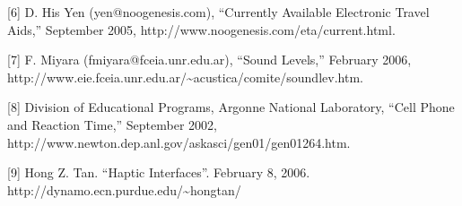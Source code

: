 {[}6{]} D. His Yen (yen@noogenesis.com), ``Currently Available
Electronic Travel Aids,'' September 2005,
http://www.noogenesis.com/eta/current.html.

{[}7{]} F. Miyara (fmiyara@fceia.unr.edu.ar), ``Sound Levels,'' February
2006,
http://www.eie.fceia.unr.edu.ar/\textasciitilde acustica/comite/soundlev.htm.

{[}8{]} Division of Educational Programs, Argonne National Laboratory,
``Cell Phone and Reaction Time,'' September 2002,
http://www.newton.dep.anl.gov/askasci/gen01/gen01264.htm.

{[}9{]} Hong Z. Tan. ``Haptic Interfaces''. February 8, 2006.
http://dynamo.ecn.purdue.edu/\textasciitilde hongtan/

